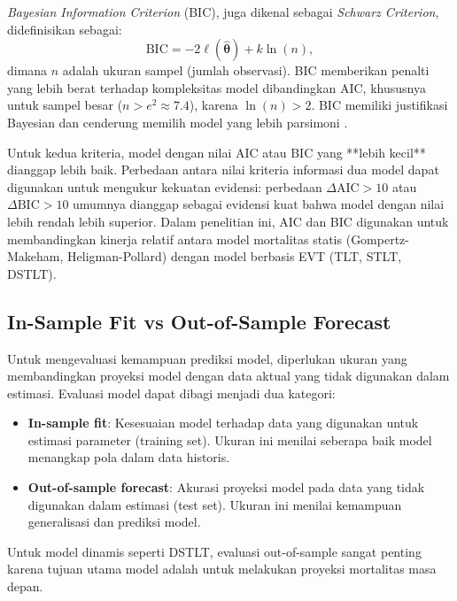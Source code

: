 \textit{Bayesian Information Criterion} (BIC), juga dikenal sebagai \textit{Schwarz Criterion}, didefinisikan sebagai:
\begin{equation}
\text{BIC} = -2\ell(\hat{\boldsymbol{\theta}}) + k \ln(n),
\label{eq:bic}
\end{equation}
dimana $n$ adalah ukuran sampel (jumlah observasi). BIC memberikan penalti yang lebih berat terhadap kompleksitas model dibandingkan AIC, khususnya untuk sampel besar ($n > e^2 \approx 7.4$), karena $\ln(n) > 2$. BIC memiliki justifikasi Bayesian dan cenderung memilih model yang lebih parsimoni \citep{schwarz1978estimating}.

Untuk kedua kriteria, model dengan nilai AIC atau BIC yang **lebih kecil** dianggap lebih baik. Perbedaan antara nilai kriteria informasi dua model dapat digunakan untuk mengukur kekuatan evidensi: perbedaan $\Delta \text{AIC} > 10$ atau $\Delta \text{BIC} > 10$ umumnya dianggap sebagai evidensi kuat bahwa model dengan nilai lebih rendah lebih superior. Dalam penelitian ini, AIC dan BIC digunakan untuk membandingkan kinerja relatif antara model mortalitas statis (Gompertz-Makeham, Heligman-Pollard) dengan model berbasis EVT (TLT, STLT, DSTLT).

\subsection{In-Sample Fit vs Out-of-Sample Forecast}

Untuk mengevaluasi kemampuan prediksi model, diperlukan ukuran yang membandingkan proyeksi model dengan data aktual yang tidak digunakan dalam estimasi. Evaluasi model dapat dibagi menjadi dua kategori:

\begin{itemize}
    \item \textbf{In-sample fit}: Kesesuaian model terhadap data yang digunakan untuk estimasi parameter (training set). Ukuran ini menilai seberapa baik model menangkap pola dalam data historis.
    
    \item \textbf{Out-of-sample forecast}: Akurasi proyeksi model pada data yang tidak digunakan dalam estimasi (test set). Ukuran ini menilai kemampuan generalisasi dan prediksi model.
\end{itemize}

Untuk model dinamis seperti DSTLT, evaluasi out-of-sample sangat penting karena tujuan utama model adalah untuk melakukan proyeksi mortalitas masa depan.

